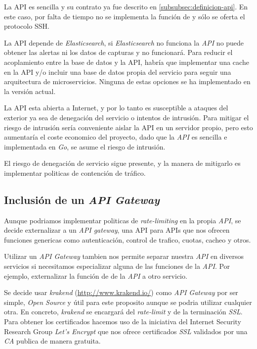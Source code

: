 La API es sencilla y su contrato ya fue descrito en \ref{subsubsec:definicion-api}. En este caso, por falta de tiempo no se implementa
la función de  y sólo se oferta el protocolo SSH.

La API depende de \emph{Elasticsearch}, si \emph{Elasticsearch} no funciona la \emph{API} no puede obtener las alertas ni los datos de capturas y no funcionará. Para reducir el acoplamiento entre la base de datos y la API, habría que implementar una cache 
en la API y/o incluir una base de datos propia del servicio para seguir una arquitectura de microservicios. Ninguna de estas opciones se ha implementado en la versión actual.


La API esta abierta a Internet, y por lo tanto es susceptible a ataques del exterior ya sea de denegación del servicio o intentos de intrusión. 
Para mitigar el riesgo de intrusión sería conveniente aislar la API en un servidor propio, pero esto aumentaría el coste economico del proyecto, dado 
que la \emph{API} es sencilla e implementada en \emph{Go}, se asume el riesgo de intrusión.

El riesgo de denegación de servicio sigue presente, y la manera de mitigarlo es implementar politicas de contención de tráfico.


\subsection{Inclusión de un \emph{API Gateway} }

Aunque podriamos implementar politicas de \emph{rate-limiting} en la propia \emph{API}, se decide externalizar a un \emph{API gateway}, una API para APIs que nos ofrecen funciones genericas como
autenticación, control de trafico, cuotas, cacheo y otros. 

Utilizar un \emph{API Gateway} tambien nos permite separar nuestra \emph{API} en diversos servicios si necesitamos especializar alguna de las funciones
de la \emph{API}. Por ejemplo, externalizar la función de  de la \emph{API} a otro servicio. 

Se decide usar \emph{krakend} (\href{http://www.krakend.io/}{http://www.krakend.io/}) como \emph{API Gateway} por ser simple, \emph{Open Source} y útil para este proposito aunque se podria utilizar cualquier otra. En concreto, 
\emph{krakend} se encargará del \emph{rate-limit} y de la terminación \emph{SSL}. Para obtener los certificados hacemos uso de la iniciativa del Internet Security Research Group \emph{Let's Encrypt} que nos
ofrece certificados \emph{SSL} validados por una \emph{CA} publica de manera gratuita.


